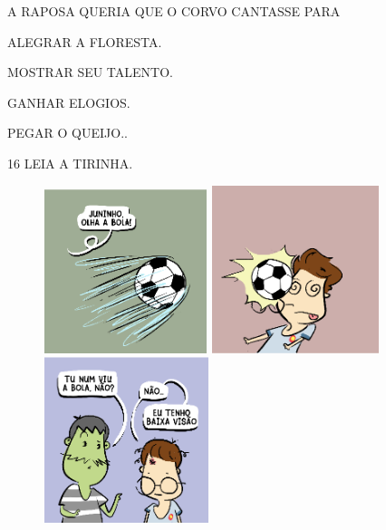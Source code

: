 A RAPOSA QUERIA QUE O CORVO CANTASSE PARA

\begin{escolha}
\item ALEGRAR A FLORESTA.

\item MOSTRAR SEU TALENTO.

\item GANHAR ELOGIOS.

\item PEGAR O QUEIJO..
\end{escolha}

\num{16} LEIA A TIRINHA.

\begin{figure}[htpb]
\includegraphics[width=1.88542in,height=1.88542in]{media/image236.png}
\includegraphics[width=1.92708in,height=1.92708in]{media/image237.png}
\includegraphics[width=1.90625in,height=1.90625in]{media/image238.png}
\end{figure}


